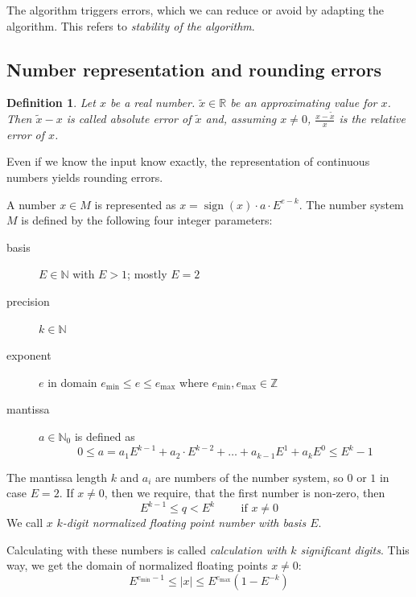 \documentclass[a4paper]{article}
\newcounter{lecref}[section]
\numberwithin{lecref}{section}
\theoremstyle{break}
\newtheorem{definition}[lecref]{Definition}
\newcommand{\Abs}[1]{\left|#1\right|}
\DeclareMathOperator{\sign}{sign}
\begin{document}
The algorithm triggers errors, which we can reduce or avoid by adapting the algorithm.
This refers to \emph{stability of the algorithm}.

\subsection{Number representation and rounding errors}

\begin{definition}
  Let $x$ be a real number. $\tilde x \in \mathbb R$ be an approximating value for $x$.
  Then $\tilde x - x$ is called \emph{absolute error} of $\tilde x$ and, assuming $x \neq 0$, $\frac{x - \tilde x}{x}$ is the \emph{relative error of $x$}.
\end{definition}

Even if we know the input know exactly, the representation of continuous numbers yields rounding errors.

A number $x \in M$ is represented as $x = \sign(x) \cdot a \cdot E^{e - k}$.
The number system $M$ is defined by the following four integer parameters:
\begin{description}
  \item[basis] $E \in \mathbb N$ with $E > 1$; mostly $E = 2$
  \item[precision] $k \in \mathbb N$
  \item[exponent] $e$ in domain $e_{\min} \leq e \leq e_{\max}$ where $e_{\min}, e_{\max} \in \mathbb Z$
  \item[mantissa] $a \in \mathbb N_0$ is defined as
    \[ 0 \leq a = a_1 E^{k-1} + a_2 \cdot E^{k-2} + \dots + a_{k-1} E^1 + a_k E^0 \leq E^k - 1 \]
\end{description}

The mantissa length $k$ and $a_i$ are numbers of the number system, so $0$ or $1$ in case $E = 2$.
If $x \neq 0$, then we require, that the first number is non-zero, then
\[ E^{k-1} \leq q < E^k \qquad \text{ if } x \neq 0 \]
We call $x$ \emph{$k$-digit normalized floating point number with basis $E$}.

Calculating with these numbers is called \emph{calculation with $k$ significant digits}.
This way, we get the domain of normalized floating points $x \neq 0$:
\[ E^{e_{\min} - 1} \leq \Abs{x} \leq E^{e_{\max}} (1 - E^{-k}) \]
\end{document}
